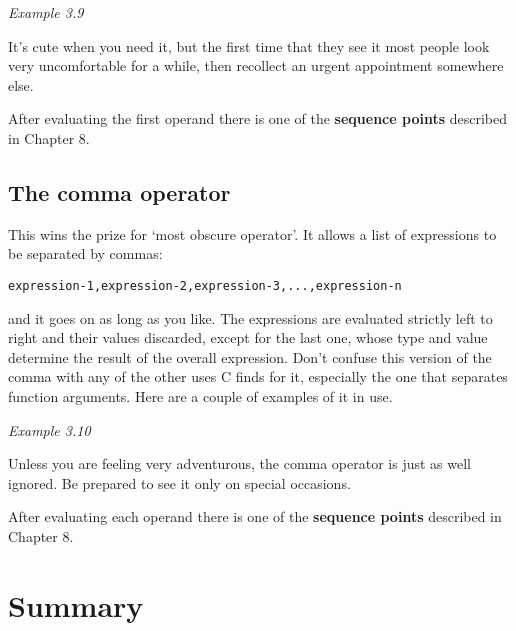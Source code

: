     \begin{center}\textit{Example 3.9}\end{center}


   It's cute when you need it, but the first time that they see it most
    people look very uncomfortable for a while, then recollect an urgent
    appointment somewhere else.


   After evaluating the first operand there is one of the \textbf{sequence
    points} described in Chapter 8.



  

  \subsection{The comma operator}
   

   This wins the prize for `most obscure operator'. It allows a list
    of expressions to be separated by commas:


   \begin{Verbatim}
expression-1,expression-2,expression-3,...,expression-n
\end{Verbatim}

   and it goes on as long as you like. The expressions are
    evaluated strictly left to right and their values discarded, except for
    the last one, whose type and value determine the result of the overall
    expression. Don't confuse this version of the comma with any of the other
    uses C finds for it, especially the one that separates function arguments.
    Here are a couple of examples of it in use.


   \begin{center}\textit{Example 3.10}\end{center}


   Unless you are feeling very adventurous, the comma operator is just as
    well ignored. Be prepared to see it only on special occasions.


   After evaluating each operand there is one of the \textbf{sequence
    points} described in Chapter 8.


  

 
        \section{Summary}
        



